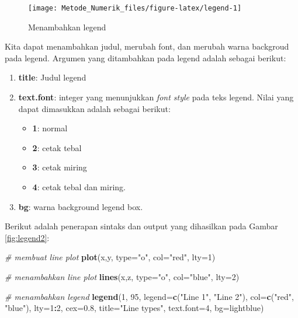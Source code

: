 \documentclass[
]{book}
\newenvironment{Shaded}{\begin{snugshade}}{\end{snugshade}}
\newcommand{\AttributeTok}[1]{\textcolor[rgb]{0.13,0.29,0.53}{#1}}
\newcommand{\CommentTok}[1]{\textcolor[rgb]{0.56,0.35,0.01}{\textit{#1}}}
\newcommand{\DecValTok}[1]{\textcolor[rgb]{0.00,0.00,0.81}{#1}}
\newcommand{\FloatTok}[1]{\textcolor[rgb]{0.00,0.00,0.81}{#1}}
\newcommand{\FunctionTok}[1]{\textcolor[rgb]{0.13,0.29,0.53}{\textbf{#1}}}
\newcommand{\NormalTok}[1]{#1}
\newcommand{\SpecialCharTok}[1]{\textcolor[rgb]{0.81,0.36,0.00}{\textbf{#1}}}
\newcommand{\StringTok}[1]{\textcolor[rgb]{0.31,0.60,0.02}{#1}}
\providecommand{\tightlist}{%
  \setlength{\itemsep}{0pt}\setlength{\parskip}{0pt}}
\theoremstyle{definition}
\theoremstyle{definition}
\theoremstyle{definition}
\theoremstyle{definition}
\theoremstyle{remark}
\begin{document}
\begin{figure}

{\centering \texttt{[image: Metode\_Numerik\_files/figure-latex/legend-1]} 

}

\caption{Menambahkan legend}\label{fig:legend}
\end{figure}

Kita dapat menambahkan judul, merubah font, dan merubah warna backgroud pada legend. Argumen yang ditambahkan pada legend adalah sebagai berikut:

\begin{enumerate}
\def\labelenumi{\alph{enumi}.}
\tightlist
\item
  \textbf{title}: Judul legend
\item
  \textbf{text.font}: integer yang menunjukkan \emph{font style} pada teks legend. Nilai yang dapat dimasukkan adalah sebagai berikut:

  \begin{itemize}
  \tightlist
  \item
    \textbf{1}: normal
  \item
    \textbf{2}: cetak tebal
  \item
    \textbf{3}: cetak miring
  \item
    \textbf{4}: cetak tebal dan miring.
  \end{itemize}
\item
  \textbf{bg}: warna background legend box.
\end{enumerate}

Berikut adalah penerapan sintaks dan output yang dihasilkan pada Gambar \ref{fig:legend2}:

\begin{Shaded}
\begin{Highlighting}[]
\CommentTok{\# membuat line plot}
\FunctionTok{plot}\NormalTok{(x,y, }\AttributeTok{type=}\StringTok{"o"}\NormalTok{, }\AttributeTok{col=}\StringTok{"red"}\NormalTok{, }\AttributeTok{lty=}\DecValTok{1}\NormalTok{)}

\CommentTok{\# menambahkan line plot}
\FunctionTok{lines}\NormalTok{(x,z, }\AttributeTok{type=}\StringTok{"o"}\NormalTok{, }\AttributeTok{col=}\StringTok{"blue"}\NormalTok{, }\AttributeTok{lty=}\DecValTok{2}\NormalTok{)}

\CommentTok{\# menambahkan legend}
\FunctionTok{legend}\NormalTok{(}\DecValTok{1}\NormalTok{, }\DecValTok{95}\NormalTok{, }\AttributeTok{legend=}\FunctionTok{c}\NormalTok{(}\StringTok{"Line 1"}\NormalTok{, }\StringTok{"Line 2"}\NormalTok{),}
       \AttributeTok{col=}\FunctionTok{c}\NormalTok{(}\StringTok{"red"}\NormalTok{, }\StringTok{"blue"}\NormalTok{), }\AttributeTok{lty=}\DecValTok{1}\SpecialCharTok{:}\DecValTok{2}\NormalTok{, }\AttributeTok{cex=}\FloatTok{0.8}\NormalTok{,}
       \AttributeTok{title=}\StringTok{"Line types"}\NormalTok{, }\AttributeTok{text.font=}\DecValTok{4}\NormalTok{, }\AttributeTok{bg=}\StringTok{\textquotesingle{}lightblue\textquotesingle{}}\NormalTok{)}
\end{Highlighting}
\end{Shaded}
\end{document}
